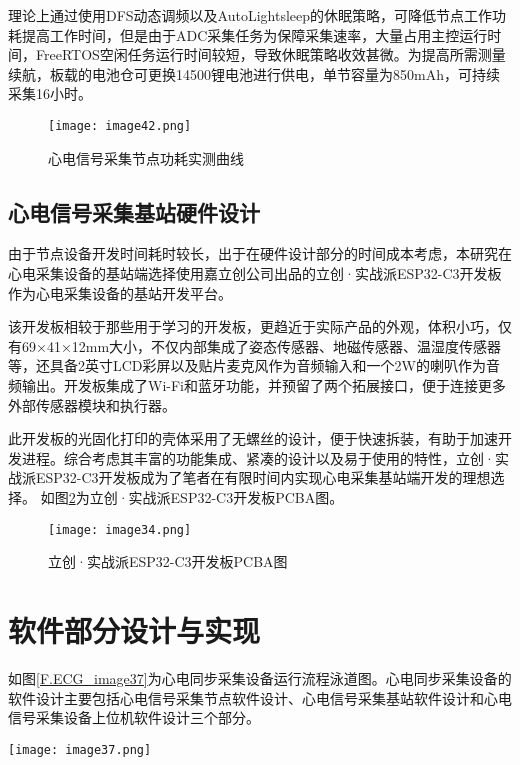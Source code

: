 理论上通过使用DFS动态调频以及AutoLightsleep的休眠策略，可降低节点工作功耗提高工作时间，但是由于ADC采集任务为保障采集速率，大量占用主控运行时间，FreeRTOS空闲任务运行时间较短，导致休眠策略收效甚微。为提高所需测量续航，板载的电池仓可更换14500锂电池进行供电，单节容量为850mAh，可持续采集16小时。

\begin{figure}[htb]
    \centering
    \texttt{[image: image42.png]}
    \caption{心电信号采集节点功耗实测曲线}
    \label{F.ECG_image42}
\end{figure}

\subsection{心电信号采集基站硬件设计}

由于节点设备开发时间耗时较长，出于在硬件设计部分的时间成本考虑，本研究在心电采集设备的基站端选择使用嘉立创公司出品的立创·实战派ESP32-C3开发板作为心电采集设备的基站开发平台。

该开发板相较于那些用于学习的开发板，更趋近于实际产品的外观，体积小巧，仅有69×41×12mm大小，不仅内部集成了姿态传感器、地磁传感器、温湿度传感器等，还具备2英寸LCD彩屏以及贴片麦克风作为音频输入和一个2W的喇叭作为音频输出。开发板集成了Wi-Fi和蓝牙功能，并预留了两个拓展接口，便于连接更多外部传感器模块和执行器。

此开发板的光固化打印的壳体采用了无螺丝的设计，便于快速拆装，有助于加速开发进程。综合考虑其丰富的功能集成、紧凑的设计以及易于使用的特性，立创·实战派ESP32-C3开发板成为了笔者在有限时间内实现心电采集基站端开发的理想选择。 如图\ref{F.ECG_image34}为立创·实战派ESP32-C3开发板PCBA图。

\begin{figure}[htb]
    \centering
    \texttt{[image: image34.png]}
    \caption{立创·实战派ESP32-C3开发板PCBA图}
    \label{F.ECG_image34}
\end{figure}

\section{软件部分设计与实现}

如图\ref{F.ECG_image37}为心电同步采集设备运行流程泳道图。心电同步采集设备的软件设计主要包括心电信号采集节点软件设计、心电信号采集基站软件设计和心电信号采集设备上位机软件设计三个部分。

\begin{sidewaysfigure}
    \centering
    \texttt{[image: image37.png]}
    \caption{心电同步采集设备运行流程泳道图}
    \label{F.ECG_image37}
\end{sidewaysfigure}

